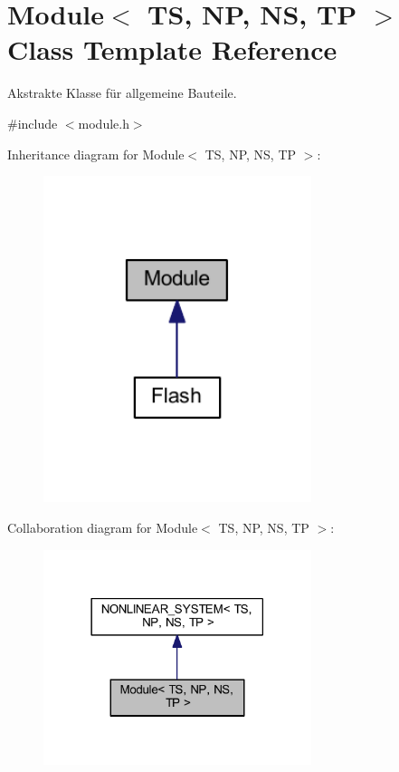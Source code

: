 \hypertarget{class_module}{}\section{Module$<$ TS, NP, NS, TP $>$ Class Template Reference}
\label{class_module}


Akstrakte Klasse für allgemeine Bauteile.  




{\ttfamily \#include $<$module.\+h$>$}



Inheritance diagram for Module$<$ TS, NP, NS, TP $>$\+:
\nopagebreak
\begin{figure}[H]
\begin{center}
\leavevmode
\includegraphics[width=222pt]{class_module__inherit__graph}
\end{center}
\end{figure}


Collaboration diagram for Module$<$ TS, NP, NS, TP $>$\+:
\nopagebreak
\begin{figure}[H]
\begin{center}
\leavevmode
\includegraphics[width=222pt]{class_module__coll__graph}
\end{center}
\end{figure}
